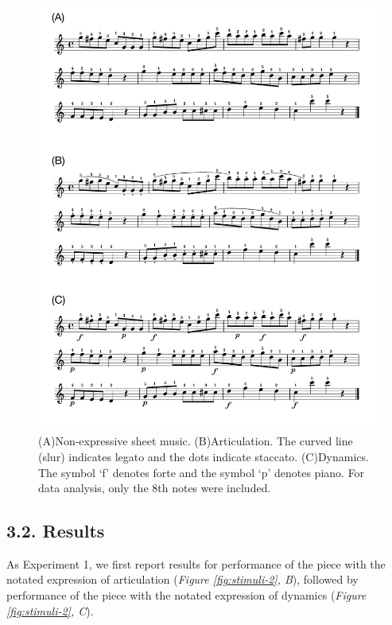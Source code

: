\documentclass[
  english,
  man,floatsintext]{apa6}
\begin{document}
\begin{figure}
\includegraphics[width=1\linewidth]{manuscript_files/figure-latex/stim-2-1} \caption{\label{fig:stimuli-2}(A)Non-expressive sheet music. (B)Articulation. The curved line (slur) indicates legato and the dots indicate staccato. (C)Dynamics. The symbol `f' denotes forte and the symbol `p' denotes piano. For data analysis, only the 8th notes were included.}\label{fig:stim-2}
\end{figure}

\clearpage

\hypertarget{results-1}{%
\subsection{3.2. Results}\label{results-1}}

As Experiment 1, we first report results for performance of the piece with the notated expression of articulation (\emph{Figure \ref{fig:stimuli-2}, B}), followed by performance of the piece with the notated expression of dynamics (\emph{Figure \ref{fig:stimuli-2}, C}).
\end{document}
